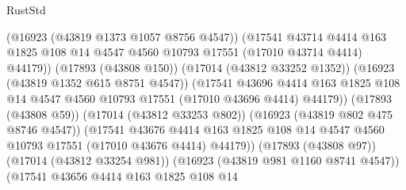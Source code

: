 \begin{lexlean}{RustStd}
\begin{coremodule}
{\begin{coremodule}
{{{{{{{{{{{{{{{{{{{{{{{{{{{{{{{{{{{{{{{{{{{{{{{{{{{{{{{                                    (@16923 (@43819 @1373 @1057 @8756 @4547))
                                    (@17541
                                      @43714
                                      @4414
                                      @163
                                      @1825
                                      @108
                                      @14
                                      @4547
                                      @4560
                                      @10793
                                      @17551
                                      (@17010 @43714 @4414)
                                      @44179))
                                  (@17893 (@43808 @150))
                                  (@17014 (@43812 @33252 @1352))
                                  (@16923 (@43819 @1352 @615 @8751 @4547))
                                  (@17541
                                    @43696
                                    @4414
                                    @163
                                    @1825
                                    @108
                                    @14
                                    @4547
                                    @4560
                                    @10793
                                    @17551
                                    (@17010 @43696 @4414)
                                    @44179))
                                (@17893 (@43808 @59))
                                (@17014 (@43812 @33253 @802))
                                (@16923 (@43819 @802 @475 @8746 @4547))
                                (@17541
                                  @43676
                                  @4414
                                  @163
                                  @1825
                                  @108
                                  @14
                                  @4547
                                  @4560
                                  @10793
                                  @17551
                                  (@17010 @43676 @4414)
                                  @44179))
                              (@17893 (@43808 @97))
                              (@17014 (@43812 @33254 @981))
                              (@16923 (@43819 @981 @1160 @8741 @4547))
                              (@17541
                                @43656
                                @4414
                                @163
                                @1825
                                @108
                                @14
}}}}}}}}}}}}}}}}}}}}}}}}}}}}}}}}}}}}}}}}}}}}}}}}}}}}}}}
\end{coremodule}}
\end{coremodule}
\end{lexlean}

